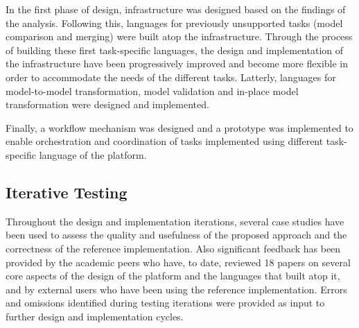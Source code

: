 In the first phase of design, infrastructure was designed based on the findings of the analysis. Following this, languages for previously unsupported tasks (model comparison and merging) were built atop the infrastructure. Through the process of building these first task-specific languages, the design and implementation of the infrastructure have been progressively improved and become more flexible in order to accommodate the needs of the different tasks. Latterly, languages for model-to-model transformation, model validation and in-place model transformation were designed and implemented. 

Finally, a workflow mechanism was designed and a prototype was implemented to enable orchestration and coordination of tasks implemented using different task-specific language of the platform.

\subsection{Iterative Testing}

Throughout the design and implementation iterations, several case studies have been used to assess the quality and usefulness of the proposed approach and the correctness of the reference implementation. Also significant feedback has been provided by the academic peers who have, to date, reviewed 18 papers on several core aspects of the design of the platform and the languages that built atop it, and by external users who have been using the reference implementation. Errors and omissions identified during testing iterations were provided as input to further design and implementation cycles.